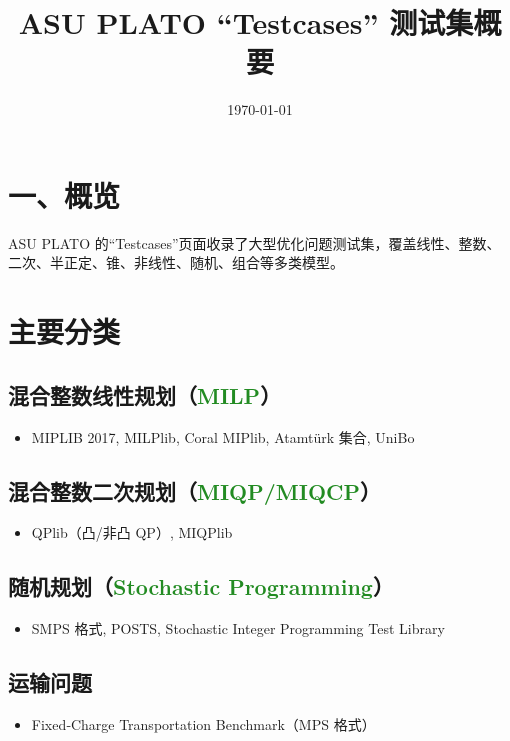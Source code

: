 \documentclass{article}
\title{ASU PLATO “Testcases” 测试集概要}
\date{\today}
\begin{document}
\maketitle

\section*{一、概览}
ASU PLATO 的“Testcases”页面收录了大型优化问题测试集，覆盖线性、整数、二次、半正定、锥、非线性、随机、组合等多类模型。

\section{主要分类}

\subsection{混合整数线性规划（\textcolor{ForestGreen}{MILP}）}
\begin{itemize}
  \item MIPLIB 2017, MILPlib, Coral MIPlib, Atamtürk 集合, UniBo
\end{itemize}

\subsection{混合整数二次规划（\textcolor{ForestGreen}{MIQP/MIQCP}）}
\begin{itemize}
  \item QPlib（凸/非凸 QP）, MIQPlib
\end{itemize}

\subsection{随机规划（\textcolor{ForestGreen}{Stochastic Programming}）}
\begin{itemize}
  \item SMPS 格式, POSTS, Stochastic Integer Programming Test Library
\end{itemize}

\subsection{运输问题}
\begin{itemize}
  \item Fixed‑Charge Transportation Benchmark（MPS 格式）
\end{itemize}
\end{document}
